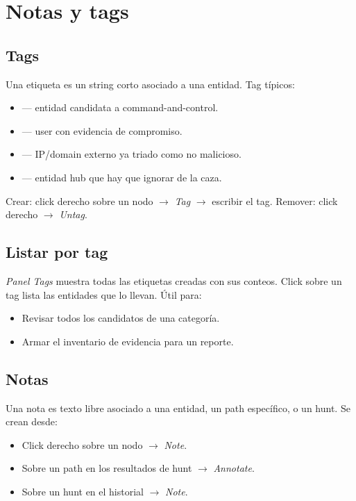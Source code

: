 \chapter{Notas y tags}
\label{sec:man-notas}

\section{Tags}

Una etiqueta es un string corto asociado a una entidad. Tag típicos:

\begin{itemize}
    \item {} — entidad candidata a command-and-control.
    \item {} — user con evidencia de compromiso.
    \item {} — IP/domain externo ya triado como no malicioso.
    \item {} — entidad hub que hay que ignorar de la caza.
\end{itemize}

Crear: click derecho sobre un nodo $\to$ \emph{Tag} $\to$ escribir
el tag. Remover: click derecho $\to$ \emph{Untag}.

\section{Listar por tag}

\emph{Panel \textrightarrow{} Tags} muestra todas las etiquetas
creadas con sus conteos. Click sobre un tag lista las entidades
que lo llevan. Útil para:

\begin{itemize}
    \item Revisar todos los candidatos de una categoría.
    \item Armar el inventario de evidencia para un reporte.
\end{itemize}

\section{Notas}

Una nota es texto libre asociado a una entidad, un path
específico, o un hunt. Se crean desde:

\begin{itemize}
    \item Click derecho sobre un nodo $\to$ \emph{Note}.
    \item Sobre un path en los resultados de hunt $\to$
    \emph{Annotate}.
    \item Sobre un hunt en el historial $\to$ \emph{Note}.
\end{itemize}

